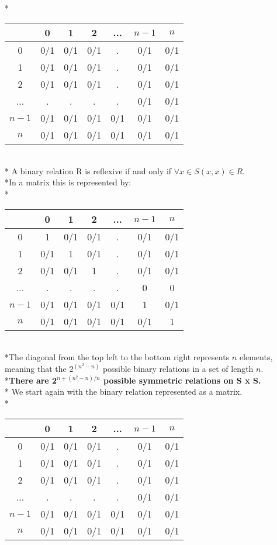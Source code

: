 \documentclass[12pt]{article}
\begin{document}
\\*\begin{tabular}{c|cccccc}
& 0 & 1 & 2 & ... & $n-1$ & $n$\\
\hline
0 & 0/1 & 0/1 & 0/1 & . & 0/1 & 0/1\\
1 & 0/1 & 0/1 & 0/1 & . & 0/1 & 0/1\\
2 & 0/1 & 0/1 & 0/1 & . & 0/1 & 0/1\\
... & . & . & . & . & 0/1 & 0/1\\
$n-1$ & 0/1 & 0/1 & 0/1 & 0/1 & 0/1 & 0/1\\
$n$ & 0/1 & 0/1 & 0/1 & 0/1 & 0/1 & 0/1\\
\end{tabular}
\medskip
\\* A binary relation R is reflexive if and only if $\forall x \in S (x,x) \in R$.
\\*In a matrix this is represented by:
\\*\begin{tabular}{c|cccccc}
& 0 & 1 & 2 & ... & $n-1$ & $n$\\
\hline
0 & 1 & 0/1 & 0/1 & . & 0/1 & 0/1\\
1 & 0/1 & 1 & 0/1 & . & 0/1 & 0/1\\
2 & 0/1 & 0/1 & 1 & . & 0/1 & 0/1\\
... & . & . & . & . & 0 & 0\\
$n-1$ & 0/1 & 0/1 & 0/1 & 0/1 & 1 & 0/1\\
$n$ & 0/1 & 0/1 & 0/1 & 0/1 & 0/1 & 1\\
\end{tabular}
\medskip
\\*The diagonal from the top left to the bottom right represents $n$ elements, meaning that the $2^(n^2-n)$ possible binary relations in a set of length $n$.
\bigskip
\\*\textbf{There are 2$^{n+(n^2-n)/n}$ possible symmetric relations on S x S.}
\\* We start again with the binary relation represented as a matrix. 
\\*\begin{tabular}{c|cccccc}
& 0 & 1 & 2 & ... & $n-1$ & $n$\\
\hline
0 & 0/1 & 0/1 & 0/1 & . & 0/1 & 0/1\\
1 & 0/1 & 0/1 & 0/1 & . & 0/1 & 0/1\\
2 & 0/1 & 0/1 & 0/1 & . & 0/1 & 0/1\\
... & . & . & . & . & 0/1 & 0/1\\
$n-1$ & 0/1 & 0/1 & 0/1 & 0/1 & 0/1 & 0/1\\
$n$ & 0/1 & 0/1 & 0/1 & 0/1 & 0/1 & 0/1\\
\end{tabular}
\end{document}
